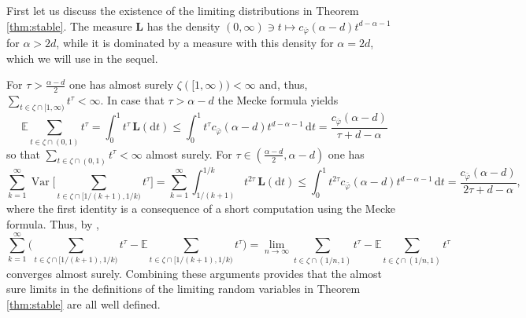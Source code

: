 \documentclass{article}
\theoremstyle{definition}
\numberwithin{equation}{section}
\theoremstyle{remark}
\begin{document}
First let us discuss the existence of the limiting distributions in Theorem \ref{thm:stable}. The measure $\mathbf{L}$ has the density $(0,\infty)\ni t\mapsto c_{\bar{\varphi}} (\alpha-d) t^{d-\alpha-1}$ for $\alpha>2d$, while it is dominated by a measure with this density for $\alpha=2d$, which we will use in the sequel.

For $\tau>\frac{\alpha-d}{2}$ one has almost surely $\zeta([1,\infty))<\infty$ and, thus, $\sum_{t\in\zeta\cap[1,\infty)}t^\tau<\infty$. In case that $\tau>\alpha-d$ the Mecke formula yields
$$
\mathbb{E}\sum_{t\in\zeta\cap(0,1)} t^\tau = \int_0^1 t^\tau \, \mathbf{L}(\mathrm{d}t) \leq \int_0^1 t^\tau c_{\bar{\varphi}} (\alpha-d) t^{d-\alpha-1} \, \mathrm{d}t = \frac{c_{\bar{\varphi}} (\alpha-d)}{\tau+d-\alpha}
$$
so that $\sum_{t\in\zeta\cap(0,1)}t^\tau<\infty$ almost surely. For $\tau\in(\frac{\alpha-d}{2},\alpha-d)$ one has
$$
\sum_{k=1}^\infty \operatorname{Var}\bigg[ \sum_{t\in\zeta\cap[1/(k+1),1/k)} t^\tau \bigg] = \sum_{k=1}^\infty \int_{1/(k+1)}^{1/k} t^{2\tau} \, \mathbf{L}(\mathrm{d}t) \leq \int_0^1 t^{2\tau} c_{\bar{\varphi}} (\alpha-d) t^{d-\alpha-1} \, \mathrm{d}t  = \frac{c_{\bar{\varphi}}(\alpha-d)}{2\tau+d-\alpha}, 
$$
where the first identity is a consequence of a short computation using the Mecke formula. Thus, by \cite[Lemma 5.16]{Kallenberg_2023},
$$
\sum_{k=1}^\infty \bigg( \sum_{t\in\zeta\cap[1/(k+1),1/k)} t^\tau - \mathbb{E} \sum_{t\in\zeta\cap[1/(k+1),1/k)} t^\tau \bigg) = \lim_{n\to\infty} \sum_{t\in\zeta\cap(1/n,1)} t^\tau - \mathbb{E}\sum_{t\in\zeta\cap(1/n,1)} t^\tau  
$$
converges almost surely. Combining these arguments provides that the almost sure limits in the definitions of the limiting random variables in Theorem \ref{thm:stable} are all well defined.
\end{document}
